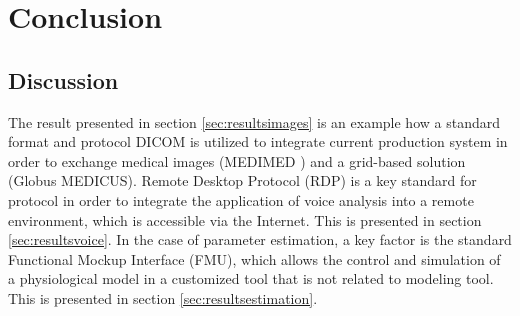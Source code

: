 \chapter{Conclusion}
\label{sec:conclusion}

\section{Discussion}
\label{sec:discussion}



The result presented in section \ref{sec:resultsimages} is an example how a standard format and protocol DICOM is utilized to integrate current production system in order to exchange medical images (MEDIMED \cite{Slavicek2010}) and a grid-based solution (Globus MEDICUS\cite{Erberich2007}). Remote Desktop Protocol (RDP) is a key standard for protocol in order to integrate the application of voice analysis\cite{Fric2007} into a remote environment, which is accessible via the Internet. This is presented in section \ref{sec:resultsvoice}. In the case of parameter estimation, a key factor is the standard Functional Mockup Interface (FMU)\cite{Blochwitza},  which allows the control and simulation of a physiological model in a customized tool that is not related to modeling tool. This is presented in section \ref{sec:resultsestimation}. 

